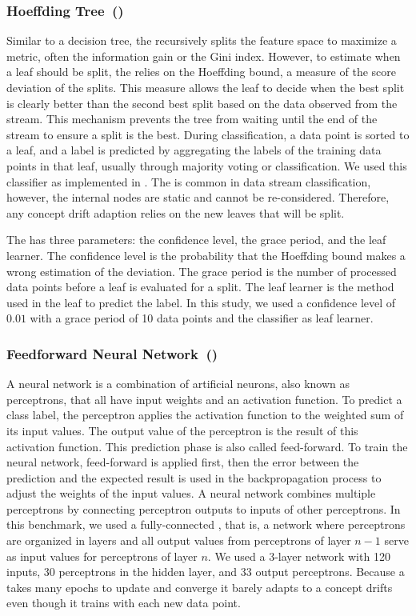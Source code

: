 \subsubsection{Hoeffding Tree~(\hoeffdingtree)~\cite{VFDT}}
Similar to a decision tree, the \hoeffdingtree recursively splits the feature
space to maximize a metric, often the information gain or the Gini index.
However,  to estimate when a leaf should be split, the \hoeffdingtree relies on
the Hoeffding bound, a measure of the score deviation of the splits.  This
measure allows the leaf to decide when the best split is clearly better than the
second best split based on the data observed from the stream. This mechanism
prevents the tree from waiting until the end of the stream to ensure a split is
the best. During classification, a data point is sorted to a leaf, and a label
is predicted by aggregating the labels of the training data points in that leaf,
usually through majority voting or \naivebayes classification.  We used this
classifier as implemented in \streamdmcpp.  The \hoeffdingtree is common in data
stream classification, however, the internal nodes are static and cannot be
re-considered. Therefore, any concept drift adaption relies on the new leaves
that will be split.

The \hoeffdingtree has three parameters: the confidence level, the grace period,
and the leaf learner. The confidence level is the probability that the Hoeffding
bound makes a wrong estimation of the deviation. The grace period is the number
of processed data points before a leaf is evaluated for a split.  The leaf
learner is the method used in the leaf to predict the label.  In this study, we
used a confidence level of $0.01$ with a grace period of 10 data points and the
\naivebayes classifier as leaf learner.

\subsubsection{Feedforward Neural Network~(\FNN)}
\label{sec:method-fnn}
A neural network is a combination of artificial neurons, also known as
perceptrons, that all have input weights and an activation function.  To predict
a class label, the perceptron applies the activation function to the weighted
sum of its input values. The output value of the perceptron is the result of
this activation function.  This prediction phase is also called feed-forward. To
train the neural network, feed-forward is applied first, then the error between
the prediction and the expected result is used in the backpropagation process to
adjust the weights of the input values. A neural network combines multiple
perceptrons by connecting perceptron outputs to inputs of other perceptrons.  In
this benchmark, we used a fully-connected \FNN, that is, a network where
perceptrons are organized in layers and all output values from perceptrons of
layer $n-1$ serve as input values for perceptrons of layer $n$.  We used a
3-layer network with 120 inputs, 30 perceptrons in the hidden layer, and 33
output perceptrons.  Because a \FNN takes many epochs to update and converge it
barely adapts to a concept drifts even though it trains with each new data
point.

